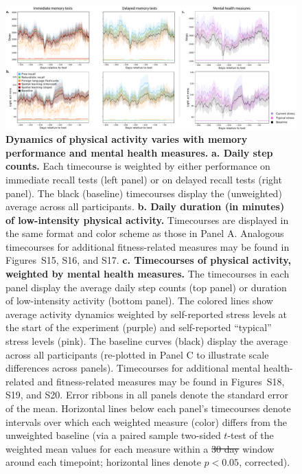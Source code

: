 \documentclass[10pt]{article}
\newcommand{\activityTimecourse}{S15}
\newcommand{\cardioTimecourse}{S16}
\newcommand{\sleepTimecourse}{S17}
\newcommand{\activityTimecourseMH}{S18}
\newcommand{\cardioTimecourseMH}{S19}
\newcommand{\sleepTimecourseMH}{S20}
\providecommand{\DIFaddtex}[1]{{\protect\color{blue}\uwave{#1}}} %
\providecommand{\DIFdeltex}[1]{{\protect\color{red}\sout{#1}}}                      %
\providecommand{\DIFaddFL}[1]{\DIFadd{#1}} %
\providecommand{\DIFdelFL}[1]{\DIFdel{#1}} %
\providecommand{\DIFaddbeginFL}{} %
\providecommand{\DIFaddendFL}{} %
\providecommand{\DIFdelbeginFL}{} %
\providecommand{\DIFdelendFL}{} %
\providecommand{\DIFadd}[1]{\texorpdfstring{\DIFaddtex{#1}}{#1}} %
\providecommand{\DIFdel}[1]{\texorpdfstring{\DIFdeltex{#1}}{}} %
\newcommand{\DIFscaledelfig}{0.5}
\newlength{\DIFdelgraphicswidth} %
\newlength{\DIFdelgraphicsheight} %
\newcommand{\DIFaddincludegraphics}[2][]{{\color{blue}\fbox{\DIFOincludegraphics[#1]{#2}}}} %
\newcommand{\DIFdelincludegraphics}[2][]{%
\sbox{\DIFdelgraphicsbox}{\DIFOincludegraphics[#1]{#2}}%
\settoboxwidth{\DIFdelgraphicswidth}{\DIFdelgraphicsbox} %
\settoboxtotalheight{\DIFdelgraphicsheight}{\DIFdelgraphicsbox} %
\scalebox{\DIFscaledelfig}{%
\parbox[b]{\DIFdelgraphicswidth}{\usebox{\DIFdelgraphicsbox}\\[-\baselineskip] \rule{\DIFdelgraphicswidth}{0em}}\llap{\resizebox{\DIFdelgraphicswidth}{\DIFdelgraphicsheight}{%
\setlength{\unitlength}{\DIFdelgraphicswidth}%
\begin{picture}(1,1)%
\thicklines\linethickness{2pt} %
{\color[rgb]{1,0,0}\put(0,0){\framebox(1,1){}}}%
{\color[rgb]{1,0,0}\put(0,0){\line( 1,1){1}}}%
{\color[rgb]{1,0,0}\put(0,1){\line(1,-1){1}}}%
\end{picture}%
}\hspace*{3pt}}} %
} %
\DeclareRobustCommand{\DIFaddbeginFL}{\DIFOaddbeginFL \let\includegraphics\DIFaddincludegraphics} %
\DeclareRobustCommand{\DIFaddendFL}{\DIFOaddendFL \let\includegraphics\DIFOincludegraphics} %
\DeclareRobustCommand{\DIFdelbeginFL}{\DIFOdelbeginFL \let\includegraphics\DIFdelincludegraphics} %
\DeclareRobustCommand{\DIFdelendFL}{\DIFOaddendFL \let\includegraphics\DIFOincludegraphics} %
\begin{document}
\begin{figure}[tp]
\centering
\includegraphics[width=\textwidth]{figs/weighted_timecourse_summary}
\caption{\textbf{Dynamics of physical activity varies with memory
    performance and mental health measures.}  \textbf{a. Daily step counts.}  Each
  timecourse is weighted by either performance on immediate recall tests
  (left panel) or on delayed recall tests (right panel).  The black
  (baseline) timecourses display the (unweighted) average across all
  participants.  \textbf{b. Daily duration (in minutes) of low-intensity physical
    activity.}  Timecourses are displayed in the same format and color
scheme as those in Panel A.  Analogous timecourses for additional
fitness-related measures may be found in Figures~\activityTimecourse,
\cardioTimecourse, and \sleepTimecourse.  \textbf{c. Timecourses of physical
  activity, weighted by mental health measures.}  The timecourses in
each panel display the average daily step counts (top panel) or
duration of low-intensity activity (bottom panel).  The colored lines
show average activity dynamics weighted by self-reported stress levels
at the start of the experiment (purple) and self-reported ``typical''
stress levels (pink).  The baseline curves (black) display the
average across all participants (re-plotted in Panel C to illustrate
scale differences across panels).  Timecourses for additional mental
health-related and fitness-related measures may be found in
Figures~\activityTimecourseMH, \cardioTimecourseMH, and \sleepTimecourseMH. Error ribbons in all panels denote
the standard error of the mean.  Horizontal lines below each panel's
timecourses denote intervals over which each weighted measure (color) differs
from the unweighted baseline (via a paired sample two-sided $t$-test
of the weighted mean values for each measure within a \DIFdelbeginFL \DIFdelFL{30 day }\DIFdelendFL \DIFaddbeginFL \DIFaddFL{30-day }\DIFaddendFL window around each timepoint; horizontal lines denote $p <
0.05$, corrected).}
\label{fig:dynamics}
\end{figure}
\end{document}
